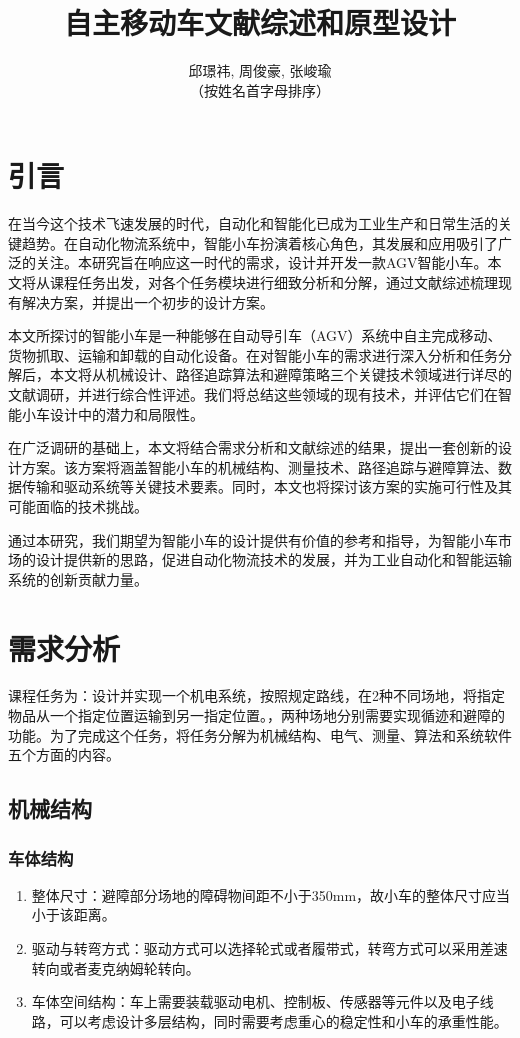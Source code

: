 \documentclass{report}
\title{自主移动车文献综述和原型设计}
\author{邱璟祎, 周俊豪, 张峻瑜\\
  （按姓名首字母排序）
}
\begin{document}
\maketitle
\tableofcontents
\newpage
\chapter{引言}

在当今这个技术飞速发展的时代，自动化和智能化已成为工业生产和日常生活的关键趋势。在自动化物流系统中，智能小车扮演着核心角色，其发展和应用吸引了广泛的关注。本研究旨在响应这一时代的需求，设计并开发一款AGV智能小车。本文将从课程任务出发，对各个任务模块进行细致分析和分解，通过文献综述梳理现有解决方案，并提出一个初步的设计方案。

本文所探讨的智能小车是一种能够在自动导引车（AGV）系统中自主完成移动、货物抓取、运输和卸载的自动化设备。在对智能小车的需求进行深入分析和任务分解后，本文将从机械设计、路径追踪算法和避障策略三个关键技术领域进行详尽的文献调研，并进行综合性评述。我们将总结这些领域的现有技术，并评估它们在智能小车设计中的潜力和局限性。

在广泛调研的基础上，本文将结合需求分析和文献综述的结果，提出一套创新的设计方案。该方案将涵盖智能小车的机械结构、测量技术、路径追踪与避障算法、数据传输和驱动系统等关键技术要素。同时，本文也将探讨该方案的实施可行性及其可能面临的技术挑战。

通过本研究，我们期望为智能小车的设计提供有价值的参考和指导，为智能小车市场的设计提供新的思路，促进自动化物流技术的发展，并为工业自动化和智能运输系统的创新贡献力量。



\chapter{需求分析}
课程任务为：设计并实现一个机电系统，按照规定路线，在2种不同场地，将指定物品从一个指定位置运输到另一指定位置。，两种场地分别需要实现循迹和避障的功能。为了完成这个任务，将任务分解为机械结构、电气、测量、算法和系统软件五个方面的内容。
\section{机械结构}
\label{sec:label}
\subsection{车体结构}
\label{subsec:label}
\begin{enumerate}
\item 整体尺寸：避障部分场地的障碍物间距不小于350mm，故小车的整体尺寸应当小于该距离。
\item 驱动与转弯方式：驱动方式可以选择轮式或者履带式，转弯方式可以采用差速转向或者麦克纳姆轮转向。
  \item 车体空间结构：车上需要装载驱动电机、控制板、传感器等元件以及电子线路，可以考虑设计多层结构，同时需要考虑重心的稳定性和小车的承重性能。
\end{enumerate}
\end{document}
